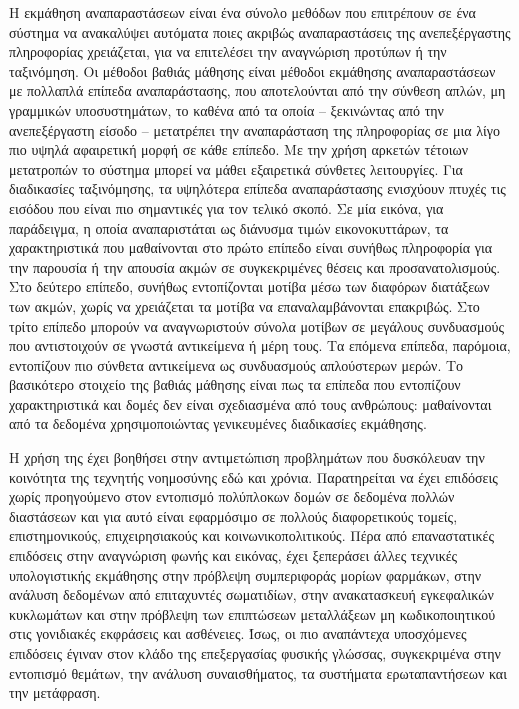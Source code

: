 Η εκμάθηση αναπαραστάσεων είναι ένα σύνολο μεθόδων που επιτρέπουν σε ένα σύστημα να ανακαλύψει αυτόματα ποιες ακριβώς αναπαραστάσεις της ανεπεξέργαστης πληροφορίας χρειάζεται, για να επιτελέσει την αναγνώριση προτύπων ή την ταξινόμηση. 
Οι μέθοδοι βαθιάς μάθησης είναι μέθοδοι εκμάθησης αναπαραστάσεων με πολλαπλά επίπεδα αναπαράστασης, που αποτελούνται από την σύνθεση απλών, μη γραμμικών υποσυστημάτων, το καθένα από τα οποία -- ξεκινώντας από την ανεπεξέργαστη είσοδο -- μετατρέπει την αναπαράσταση της πληροφορίας σε μια λίγο πιο υψηλά αφαιρετική μορφή σε κάθε επίπεδο.
Με την χρήση αρκετών τέτοιων μετατροπών το σύστημα μπορεί να μάθει εξαιρετικά σύνθετες λειτουργίες.
Για διαδικασίες ταξινόμησης, τα υψηλότερα επίπεδα αναπαράστασης ενισχύουν πτυχές τις εισόδου που είναι πιο σημαντικές για τον τελικό σκοπό.
Σε μία εικόνα, για παράδειγμα, η οποία αναπαριστάται ως διάνυσμα τιμών εικονοκυττάρων, τα χαρακτηριστικά που μαθαίνονται στο πρώτο επίπεδο είναι συνήθως πληροφορία για την παρουσία ή την απουσία ακμών σε συγκεκριμένες θέσεις και προσανατολισμούς.
Στο δεύτερο επίπεδο, συνήθως εντοπίζονται μοτίβα μέσω των διαφόρων διατάξεων των ακμών, χωρίς να χρειάζεται τα μοτίβα να επαναλαμβάνονται επακριβώς.
Στο τρίτο επίπεδο μπορούν να αναγνωριστούν σύνολα μοτίβων σε μεγάλους συνδυασμούς που αντιστοιχούν σε γνωστά αντικείμενα ή μέρη τους.
Τα επόμενα επίπεδα, παρόμοια, εντοπίζουν πιο σύνθετα αντικείμενα ως συνδυασμούς απλούστερων μερών.
Το βασικότερο στοιχείο της βαθιάς μάθησης είναι πως τα επίπεδα που εντοπίζουν χαρακτηριστικά και δομές δεν είναι σχεδιασμένα από τους ανθρώπους: μαθαίνονται από τα δεδομένα χρησιμοποιώντας γενικευμένες διαδικασίες εκμάθησης.

Η χρήση της έχει βοηθήσει στην αντιμετώπιση προβλημάτων που δυσκόλευαν την κοινότητα της τεχνητής νοημοσύνης εδώ και χρόνια. 
Παρατηρείται να έχει επιδόσεις χωρίς προηγούμενο στον εντοπισμό πολύπλοκων δομών σε δεδομένα πολλών διαστάσεων και για αυτό είναι εφαρμόσιμο σε πολλούς διαφορετικούς τομείς, επιστημονικούς, επιχειρησιακούς και κοινωνικοπολιτικούς.
Πέρα από επαναστατικές επιδόσεις στην αναγνώριση φωνής και εικόνας, έχει ξεπεράσει άλλες τεχνικές υπολογιστικής εκμάθησης στην πρόβλεψη συμπεριφοράς μορίων φαρμάκων, στην ανάλυση δεδομένων από επιταχυντές σωματιδίων, στην ανακατασκευή εγκεφαλικών κυκλωμάτων και στην πρόβλεψη των επιπτώσεων μεταλλάξεων μη κωδικοποιητικού  στις γονιδιακές εκφράσεις και ασθένειες.
Ίσως, οι πιο αναπάντεχα υποσχόμενες επιδόσεις έγιναν στον κλάδο της επεξεργασίας φυσικής γλώσσας, συγκεκριμένα στην εντοπισμό θεμάτων, την ανάλυση συναισθήματος, τα συστήματα ερωταπαντήσεων και την μετάφραση.

